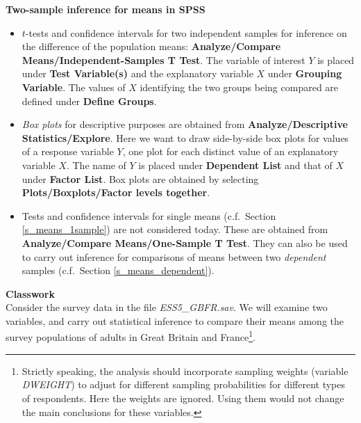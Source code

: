 
\textbf{Two-sample inference for means in SPSS}

\begin{itemize}
\item
$t$-tests and confidence intervals for two independent samples for
inference on the difference of the population
means: \textbf{Analyze/Compare Means/Independent-Samples T Test}.
The variable of interest $Y$ is placed under \textbf{Test Variable(s)} and
the explanatory variable $X$ under \textbf{Grouping Variable}.
The values of $X$ identifying the two groups being compared
are defined under \textbf{Define Groups}.
\item
\emph{Box plots} for descriptive purposes are obtained from
\textbf{Analyze/Descriptive
Statistics/Explore}.
Here we want to draw side-by-side box plots for values of a
response variable $Y$, one plot for each distinct value of an
explanatory variable $X$. The name of $Y$ is placed under
\textbf{Dependent List} and that of $X$ under \textbf{Factor List}.
Box plots are obtained by
selecting \textbf{Plots/Boxplots/Factor levels
together}.
\item
Tests and confidence intervals for single means (c.f.\ Section \ref{s_means_1sample}) are not
considered today. These are obtained from
\textbf{Analyze/Compare Means/One-Sample T Test}. They
can also be used to carry out inference for
comparisons of means  between two \emph{dependent}  samples
(c.f.\ Section \ref{s_means_dependent}).
\end{itemize}

\textbf{Classwork}\\
Consider the survey data in the file \emph{ESS5\_GBFR.sav}. We will
examine two variables, and carry out statistical inference to
compare their means among
the survey populations of adults in
Great Britain and France\footnote{Strictly speaking, the analysis should
incorporate sampling weights (variable \emph{DWEIGHT}) to adjust for
different sampling probabilities for different types of respondents.
Here the weights are ignored. Using them would not change the main
conclusions for these variables.}.

